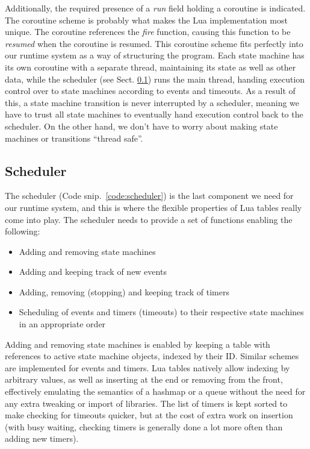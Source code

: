 Additionally, the required presence of a \emph{run} field holding a coroutine is indicated. The coroutine scheme is probably what makes the Lua implementation most unique. The coroutine references the \emph{fire} function, causing this function to be \emph{resumed} when the coroutine is resumed. This coroutine scheme fits perfectly into our runtime system as a way of structuring the program. Each state machine has its own coroutine with a separate thread, maintaining its state as well as other data, while the scheduler (see Sect. \ref{sec:impl_sched}) runs the main thread, handing execution control over to state machines according to events and timeouts. As a result of this, a state machine transition is never interrupted by a scheduler, meaning we have to trust all state machines to eventually hand execution control back to the scheduler. On the other hand, we don't have to worry about making state machines or transitions ``thread safe''.

\subsection{Scheduler}
\label{sec:impl_sched}
The scheduler (Code snip.~\ref{code:scheduler}) is the last component we need for our runtime system, and this is where the flexible properties of Lua tables really come into play. The scheduler needs to provide a set of functions enabling the following:

\begin{itemize}
	\item Adding and removing state machines
	\item Adding and keeping track of new events
	\item Adding, removing (stopping) and keeping track of timers
	\item Scheduling of events and timers (timeouts) to their respective state machines in an appropriate order
\end{itemize}

Adding and removing state machines is enabled by keeping a table with references to active state machine objects, indexed by their ID. Similar schemes are implemented for events and timers. Lua tables natively allow indexing by arbitrary values, as well as inserting at the end or removing from the front, effectively emulating the semantics of a hashmap or a queue without the need for any extra tweaking or import of libraries. The list of timers is kept sorted to make checking for timeouts quicker, but at the cost of extra work on insertion (with busy waiting, checking timers is generally done a lot more often than adding new timers).

